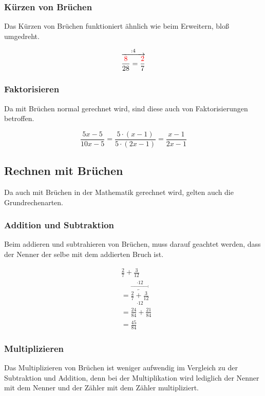 \subsubsection{Kürzen von Brüchen}
Das Kürzen von Brüchen funktioniert ähnlich wie beim Erweitern, bloß umgedreht.

\begin{beispiel}
	\[\overset{:4}{\overrightarrow{\frac{\color{red}8}{28}=\frac{\color{red}2}{7}}}\]
\end{beispiel}

\subsubsection{Faktorisieren} Da mit Brüchen normal gerechnet wird, sind diese auch von Faktorisierungen betroffen. 

\begin{beispiel}
	\[\frac{5x-5}{10x-5}=\frac{5\cdot(x-1)}{5\cdot(2x-1)}=\frac{x-1}{2x-1}\]
\end{beispiel}
\subsection{Rechnen mit Brüchen}
Da auch mit Brüchen in der Mathematik gerechnet wird, gelten auch die Grundrechenarten.
\subsubsection{Addition und Subtraktion} Beim addieren und subtrahieren von Brüchen, muss darauf geachtet werden, dass der Nenner der selbe mit dem addierten Bruch ist. 

\begin{beispiel}
\begin{align}
	&\frac{2}{7}+\frac{3}{12}\\
	&={\overset{\cdot 12}{\overrightarrow{\underset{\cdot 12}{\underleftarrow{\frac{2}{7}+\frac{3}{12}}}}}}\\
	&= \frac{24}{84}+\frac{21}{84}\\
	&= \frac{45}{84}
\end{align}	
\end{beispiel}
\subsubsection{Multiplizieren} Das Multiplizieren von Brüchen ist weniger aufwendig im Vergleich zu der Subtraktion und Addition, denn bei der Multiplikation wird lediglich der Nenner mit dem Nenner und der Zähler mit dem Zähler multipliziert.

